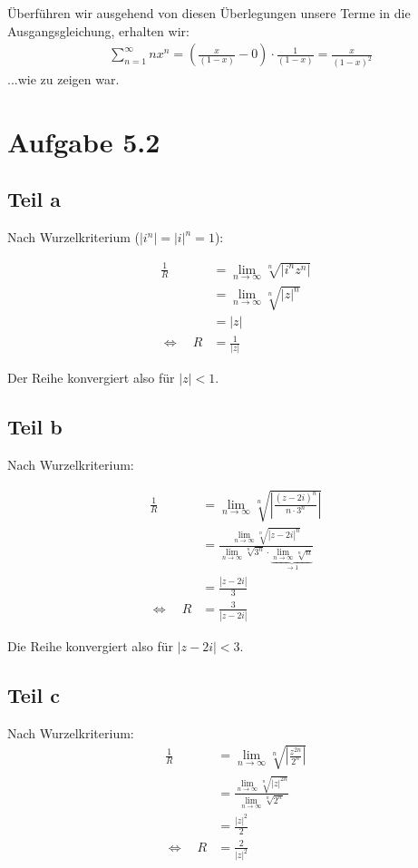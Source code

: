 \documentclass[a4paper,german,12pt,smallheadings]{scrartcl}
\begin{document}
Überführen wir ausgehend von diesen Überlegungen unsere Terme in die Ausgangsgleichung, erhalten wir:
\begin{align*}
  &\sum_{n=1}^\infty nx^n  = \left(\frac{x}{(1-x)} - 0\right) \cdot \frac{1}{(1-x)} = \frac{x}{(1-x)^2}
\end{align*}
...wie zu zeigen war.

\section*{Aufgabe 5.2}
\subsection*{Teil a}
Nach Wurzelkriterium ($|i^n| = |i|^n = 1$):

\begin{align*}
  \frac{1}{R} &= \lim_{n \to \infty} \sqrt[n]{|i^nz^n|} \\
              &= \lim_{n \to \infty} \sqrt[n]{|z|^n} \\
              &= |z| \\
  \Leftrightarrow\quad R &= \frac{1}{|z|}
\end{align*}

Der Reihe konvergiert also für $|z| < 1$.

\subsection*{Teil b}
Nach Wurzelkriterium:

\begin{align*}
  \frac{1}{R} &= \lim_{n \to \infty} \sqrt[n]{\left|\frac{(z-2i)^n}{n\cdot3^n}\right|} \\
              &= \frac{\lim_{n \to \infty} \sqrt[n]{|z-2i|^n}}{\lim_{n \to \infty} \sqrt[n]{3^n} \cdot \underbrace{\lim_{n \to \infty} \sqrt[n]{n}}_{\to 1}} \\
              &= \frac{|z-2i|}{3} \\
  \Leftrightarrow\quad R &= \frac{3}{|z-2i|}
\end{align*}

Die Reihe konvergiert also für $|z-2i| < 3$.

\subsection*{Teil c}
Nach Wurzelkriterium:
\begin{align*}
  \frac{1}{R} &= \lim_{n \to \infty} \sqrt[n]{\left|\frac{z^{2n}}{2^n}\right|} \\
              &= \frac{\lim_{n \to \infty} \sqrt[n]{|z|^{2n}}}{\lim_{n \to \infty} \sqrt[n]{2^n}} \\
              &= \frac{|z|^2}{2} \\
  \Leftrightarrow\quad R &= \frac{2}{|z|^2}
\end{align*}
\end{document}
